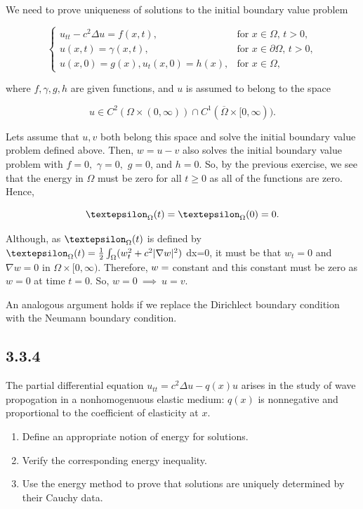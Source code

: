 \documentclass{article}
\begin{document}
We need to prove uniqueness of solutions to the initial boundary value problem

\[
  \begin{cases}
  u_{tt}-c^2\Delta u=f(x,t), &\text{for $x\in\Omega$, $t>0$,} \\
  u(x,t)=\gamma(x,t), &\text{for $x\in\partial\Omega$, $t>0$}, \\
  u(x,0)=g(x), u_t(x,0)=h(x),& \text{for $x\in\Omega$}, 
  \end{cases}
\]

where $f ,\gamma, g ,h$ are given functions, and $u$ is assumed to belong to the space

$$u\in C^2(\Omega\times(0,\infty))\cap C^1(\overline{\Omega}\times[0,\infty)).$$

Let\textsc{}s assume that $u,v$ both belong this space and solve the initial boundary value problem defined above. Then, $w=u-v$ also solves the initial boundary value problem with $f=0,$ $\gamma=0,$ $g=0$, and $h=0$. So, by the previous exercise, we see that the energy in $\Omega$ must be zero for all $t\geq 0$ as all of the functions are zero. Hence,

$$\textepsilon_{\Omega}(t)=\textepsilon_{\Omega}(0)=0.$$

Although, as $\textepsilon_{\Omega}(t)$ is defined by $\textepsilon_{\Omega}(t)=\frac{1}{2}\int_{\Omega}(w_t^2+c^2|\nabla w|^2)$ dx=0, it must be that $w_t=0$ and $\nabla w=0$ in $\Omega\times[0,\infty)$. Therefore, $w=\hspace{1mm}$constant and this constant must be zero as $w=0$ at time $t=0$. So, $w=0 ~\implies~ u=v$.

An analogous argument holds if we replace the Dirichlect boundary condition with the Neumann boundary condition.

\subsection{\textbf{3.3.4}} The partial differential equation $u_{tt}=c^2\Delta u -q(x)u$ arises in the study of wave propogation in a nonhomogenuous elastic medium: $q(x)$ is nonnegative and proportional to the coefficient of elasticity at $x$.

\begin{enumerate}[label=(\alph*)]
    \item Define an appropriate notion of energy for solutions.
    \item Verify the corresponding energy inequality.
    \item Use the energy method to prove that solutions are uniquely determined by their Cauchy data.
\end{enumerate}
\end{document}
